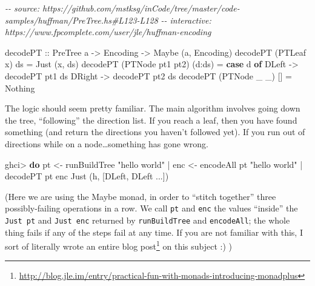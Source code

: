\documentclass[]{article}
\newenvironment{Shaded}{}{}
\newcommand{\CharTok}[1]{\textcolor[rgb]{0.25,0.44,0.63}{#1}}
\newcommand{\CommentTok}[1]{\textcolor[rgb]{0.38,0.63,0.69}{\textit{#1}}}
\newcommand{\DataTypeTok}[1]{\textcolor[rgb]{0.56,0.13,0.00}{#1}}
\newcommand{\KeywordTok}[1]{\textcolor[rgb]{0.00,0.44,0.13}{\textbf{#1}}}
\newcommand{\NormalTok}[1]{#1}
\newcommand{\OperatorTok}[1]{\textcolor[rgb]{0.40,0.40,0.40}{#1}}
\newcommand{\OtherTok}[1]{\textcolor[rgb]{0.00,0.44,0.13}{#1}}
\newcommand{\StringTok}[1]{\textcolor[rgb]{0.25,0.44,0.63}{#1}}
\renewcommand{\href}[2]{#2\footnote{\url{#1}}}
\begin{document}
\begin{Shaded}
\begin{Highlighting}[]
\CommentTok{{-}{-} source: https://github.com/mstksg/inCode/tree/master/code{-}samples/huffman/PreTree.hs\#L123{-}L128}
\CommentTok{{-}{-} interactive: https://www.fpcomplete.com/user/jle/huffman{-}encoding}

\OtherTok{decodePT ::} \DataTypeTok{PreTree}\NormalTok{ a }\OtherTok{{-}\textgreater{}} \DataTypeTok{Encoding} \OtherTok{{-}\textgreater{}} \DataTypeTok{Maybe}\NormalTok{ (a, }\DataTypeTok{Encoding}\NormalTok{)}
\NormalTok{decodePT (}\DataTypeTok{PTLeaf}\NormalTok{ x)       ds     }\OtherTok{=} \DataTypeTok{Just}\NormalTok{ (x, ds)}
\NormalTok{decodePT (}\DataTypeTok{PTNode}\NormalTok{ pt1 pt2) (d}\OperatorTok{:}\NormalTok{ds) }\OtherTok{=} \KeywordTok{case}\NormalTok{ d }\KeywordTok{of}
                                     \DataTypeTok{DLeft}  \OtherTok{{-}\textgreater{}}\NormalTok{ decodePT pt1 ds}
                                     \DataTypeTok{DRight} \OtherTok{{-}\textgreater{}}\NormalTok{ decodePT pt2 ds}
\NormalTok{decodePT (}\DataTypeTok{PTNode}\NormalTok{ \_ \_)     []     }\OtherTok{=} \DataTypeTok{Nothing}
\end{Highlighting}
\end{Shaded}

The logic should seem pretty familiar. The main algorithm involves going down
the tree, ``following'' the direction list. If you reach a leaf, then you have
found something (and return the directions you haven't followed yet). If you run
out of directions while on a node\ldots something has gone wrong.

\begin{Shaded}
\begin{Highlighting}[]
\NormalTok{ghci}\OperatorTok{\textgreater{}} \KeywordTok{do}\NormalTok{  pt  }\OtherTok{\textless{}{-}}\NormalTok{ runBuildTree }\StringTok{"hello world"}
    \OperatorTok{|}\NormalTok{     enc }\OtherTok{\textless{}{-}}\NormalTok{ encodeAll pt }\StringTok{"hello world"}
    \OperatorTok{|}\NormalTok{     decodePT pt enc}
\DataTypeTok{Just}\NormalTok{ (}\CharTok{\textquotesingle{}h\textquotesingle{}}\NormalTok{, [}\DataTypeTok{DLeft}\NormalTok{, }\DataTypeTok{DLeft} \OperatorTok{...}\NormalTok{])}
\end{Highlighting}
\end{Shaded}

(Here we are using the Maybe monad, in order to ``stitch together'' three
possibly-failing operations in a row. We call \texttt{pt} and \texttt{enc} the
values ``inside'' the \texttt{Just\ pt} and \texttt{Just\ enc} returned by
\texttt{runBuildTree} and \texttt{encodeAll}; the whole thing fails if any of
the steps fail at any time. If you are not familiar with this,
\href{http://blog.jle.im/entry/practical-fun-with-monads-introducing-monadplus}{I
sort of literally wrote an entire blog post} on this subject :) )
\end{document}
